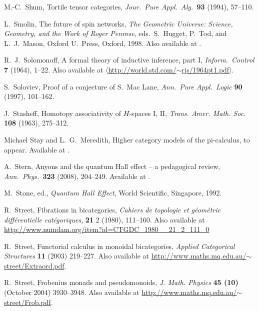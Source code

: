 \documentclass[12pt,twoside,openright]{report}
\begin{document}
\begin{thebibliography}{99}
M.-C.\ Shum, Tortile tensor categories,
\textsl{Jour.\ Pure Appl.\ Alg.\ }\textbf{93} (1994), 57--110.

 L.\ Smolin, The future of spin networks, 
{\sl The Geometric Universe: Science, Geometry, and the Work of Roger Penrose}, eds.\ S.\ Hugget, P.\ Tod, and L.\ J.\ Mason, Oxford U.\ Press, Oxford, 1998.  Also available at .

 R.\ J.\ Solomonoff, A formal theory of inductive inference, part I, {\sl Inform.\ Control} {\bf 7} (1964),
1--22.  Also available at 
\hfill \break
\href{http://world.std.com/~rjs/1964pt1.pdf}
{$\langle$http://world.std.com/$\sim$rjs/1964pt1.pdf$\rangle$}.

 S.\ Soloviev, Proof of a conjecture of S.\ Mac Lane, {\sl Ann.\ Pure Appl.\ Logic} {\bf 90} (1997), 101--162.

 J.\ Stasheff, Homotopy associativity of $H$-spaces I, II, \textsl{Trans. Amer. Math. Soc.} \textbf{108} (1963), 275--312.

 Michael Stay and L.\ G.\ Meredith, Higher category models of the pi-calculus, to appear.  Available at .

 A.\ Stern, Anyons and the quantum Hall effect --
a pedagogical review, {\sl Ann.\ Phys.\ }{\bf 323} (2008), 204--249.  Available at .

 M.\ Stone, ed., {\sl Quantum Hall Effect}, World Scientific, Singapore, 1992.

 R.\ Street, Fibrations in bicategories, \textsl{Cahiers de topologie et g\'eom\'etrie diff\'erentielle cat\'egoriques}, 
\textbf{21} 2 (1980),  111--160.  Also available at \\ \href{http://www.numdam.org/item?id=CTGDC_1980__21_2_111_0}{http://www.numdam.org/item?id=CTGDC\_1980\_\_21\_2\_111\_0}

 R.\ Street, Functorial calculus in monoidal bicategories, \textsl{Applied Categorical Structures} \textbf{11} (2003) 219--227.  Also available at
\href{http://www.maths.mq.edu.au/~street/Extraord.pdf}{http://www.maths.mq.edu.au/$\sim$street/Extraord.pdf}.

 R.\ Street, Frobenius monads and pseudomonoids, \textsl{J. Math. Physics} \textbf{45 (10)} (October 2004) 3930--3948.  Also available at
\href{http://www.maths.mq.edu.au/~street/Frob.pdf}{http://www.maths.mq.edu.au/$\sim$street/Frob.pdf}.


\end{thebibliography}
\end{document}

